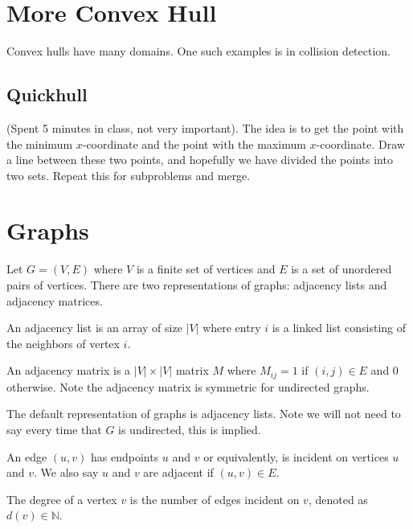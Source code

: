 
\section{More Convex Hull}

Convex hulls have many domains. One such examples is in collision detection.

\subsection{Quickhull}

(Spent 5 minutes in class, not very important).
The idea is to get the
point with the minimum $x$-coordinate and the
point
with the maximum $x$-coordinate. Draw a line between these two points,
and hopefully we have divided the points into two sets. Repeat this
for subproblems and merge.

\section{Graphs}

Let $G = (V, E)$ where $V$ is a finite set of vertices and $E$ is a
set of unordered pairs of vertices. There are two representations of
graphs: adjacency lists and adjacency matrices. 

\begin{definition}
    An adjacency list is an array of size $|V|$ where entry $i$ is a
    linked list consisting of the neighbors of vertex $i$.
\end{definition}

\begin{definition}
    An adjacency matrix is a $|V| \times |V|$ matrix $M$ where
    $M_{ij} = 1$ if $(i, j) \in E$ and 0 otherwise. Note the adjacency
    matrix is symmetric for undirected graphs.
\end{definition}

The default representation of graphs is adjacency lists. Note we will
not need to say every time that $G$ is undirected, this
is
implied.

\begin{definition}
    An edge $(u, v)$ has endpoints $u$ and $v$ or equivalently, is
    incident on
    vertices $u$ and $v$. We also say $u$ and $v$ are adjacent if $
    (u, v) \in E$.
\end{definition}

\begin{definition}
    The degree of a vertex $v$ is the number of edges incident on $v$,
    denoted as $d(v) \in \mathbb{N}$.
\end{definition}

